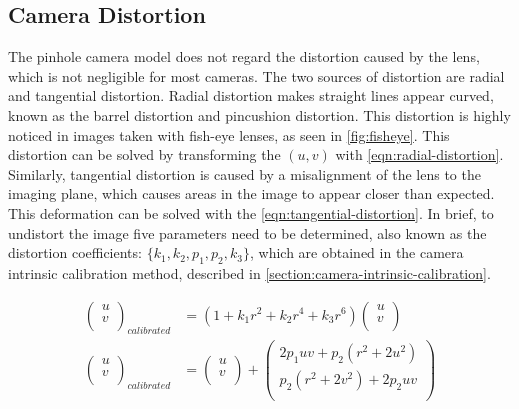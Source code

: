 \subsection{Camera Distortion}

The pinhole camera model does not regard the distortion caused by the lens, which is not negligible for most cameras. The two sources of distortion are radial and tangential distortion. Radial distortion makes straight lines appear curved, known as the barrel distortion and pincushion distortion. This distortion is highly noticed in images taken with fish-eye lenses, as seen in \cref{fig:fisheye}. This distortion can be solved by transforming the $(u, v)$ with \cref{eqn:radial-distortion}. Similarly, tangential distortion is caused by a misalignment of the lens to the imaging plane, which causes areas in the image to appear closer than expected. This deformation can be solved with the \cref{eqn:tangential-distortion}. In brief, to undistort the image five parameters need to be determined, also known as the distortion coefficients: $\{k_1, k_2, p_1, p_2, k_3\}$, which are obtained in the camera intrinsic calibration method, described in \cref{section:camera-intrinsic-calibration}.

\begin{align}
    \label{eqn:radial-distortion}
    \left(
        \begin{array}{c}
            u \\ v \\
        \end{array}
    \right)_{calibrated}
    & =
    (1 + k_1 r^2 + k_2 r^4 + k_3 r^6)
    \left(
        \begin{array}{c}
            u \\ v \\
        \end{array}
    \right)
    \\
    \label{eqn:tangential-distortion}
    \left(
        \begin{array}{c}
            u \\ v \\
        \end{array}
    \right)_{calibrated}
    & =
    \left(
        \begin{array}{c}
            u \\ v \\
        \end{array}
    \right)
    + 
    \left(
        \begin{array}{c}
            2 p_1 u v + p_2 (r^2 + 2u^2) \\
            p_2 (r^2 + 2v^2) + 2 p_2 u v \\
        \end{array}
    \right)
\end{align}

